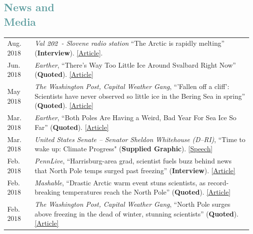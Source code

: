\documentclass[margin,line,palatino,courier,10pt]{res}
\begin{document}
\begin{resume}
\section{\sc \textcolor{CadetBlue}{\large{News and\\ Media}}}
\vspace*{0.04in}
\begin{tabular}{@{}p{0.8in}p{4in}}
Aug. $2018$ & \textit{Val $\it{202}$ - Slovene radio station} ``The Arctic is rapidly melting'' (\textbf{Interview}). \href{https://val202.rtvslo.si/2018/08/sonce-je-odprlo-zemljin-hladilnik/}{[Article]}.\\
Jun. $2018$ & \textit{Earther}, ``There's Way Too Little Ice Around Svalbard Right Now'' (\textbf{Quoted}). \href{https://earther.com/theres-way-too-little-ice-around-svalbard-right-now-1826567780}{[Article]}\\
May $2018$ & \textit{The Washington Post, Capital Weather Gang}, ``'Fallen off a cliff': Scientists have never observed so little ice in the Bering Sea in spring'' (\textbf{Quoted}). \href{https://www.washingtonpost.com/news/capital-weather-gang/wp/2018/05/03/fallen-off-a-cliff-scientists-have-never-observed-so-little-ice-in-the-bering-sea-in-spring/?noredirect=on&utm_term=.cbcf2781b5e4}{[Article]}\\
Mar. $2018$ & \textit{Earther}, ``Both Poles Are Having a Weird, Bad Year For Sea Ice So Far'' (\textbf{Quoted}). \href{https://earther.com/both-poles-are-having-a-weird-bad-year-for-sea-ice-so-1824074352}{[Article]}\\
Mar. $2018$ & \textit{United States Senate -- Senator Sheldon Whitehouse (D--RI)}, ``Time to wake up: Climate Progress" (\textbf{Supplied Graphic}). \href{https://www.youtube.com/watch?v=C_E5OQgt2SE}{[Speech]}\\
Feb. $2018$ & \textit{PennLive}, ``Harrisburg-area grad, scientist fuels buzz behind news that North Pole temps surged past freezing'' (\textbf{Interview}). \href{http://www.pennlive.com/news/2018/02/harrisburg-area_scientist_is_b.html}{[Article]}\\
Feb. $2018$ & \textit{Mashable}, ``Drastic Arctic warm event stuns scientists, as record-breaking temperatures reach the North Pole'' (\textbf{Quoted}). \href{https://mashable.com/2018/02/26/arctic-heat-wave-north-pole-february-sea-ice/?utm_cid=hp-h-2#jZ.Ip1wPjkqD}{[Article]}\\
Feb. $2018$ & \textit{The Washington Post, Capital Weather Gang}, ``North Pole surges above freezing in the dead of winter, stunning scientists'' (\textbf{Quoted}). \href{https://www.washingtonpost.com/news/capital-weather-gang/wp/2018/02/26/north-pole-surges-above-freezing-in-the-dead-of-winter-stunning-scientists/?utm_term=.6025384d6bf1}{[Article]}\\

\end{tabular}
\end{resume}
\end{document}
